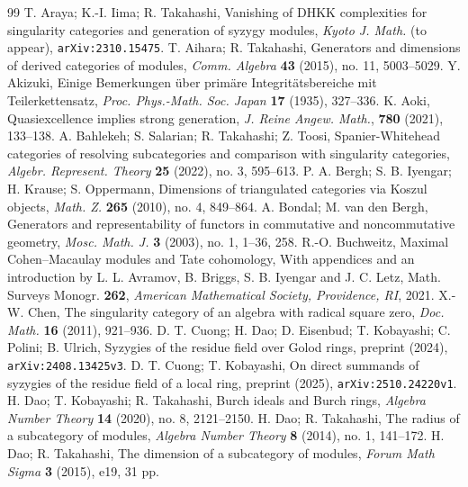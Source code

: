 \documentclass[10pt]{amsart}
\theoremstyle{definition}
\theoremstyle{remark}
\numberwithin{equation}{thm}
\begin{document}
\begin{thebibliography}{99}
{\sc T. Araya; K.-I. Iima; R. Takahashi}, 
Vanishing of DHKK complexities for singularity categories and generation of syzygy modules, {\em Kyoto J. Math.} (to appear), {\tt arXiv:2310.15475}.
{\sc T. Aihara; R. Takahashi}, Generators and dimensions of derived categories of modules, {\em Comm. Algebra} {\bf 43} (2015), no. 11, 5003--5029.
{\sc Y. Akizuki}, Einige Bemerkungen \"uber prim\"are Integrit\"atsbereiche mit Teilerkettensatz, {\em Proc. Phys.-Math. Soc. Japan} {\bf 17} (1935), 327--336.
{\sc K. Aoki}, Quasiexcellence implies strong generation, {\em J. Reine Angew. Math.}, {\bf 780} (2021), 133--138.
{\sc A. Bahlekeh; S. Salarian; R. Takahashi; Z. Toosi}, Spanier-Whitehead categories of resolving subcategories and comparison with singularity categories, {\em Algebr. Represent. Theory} {\bf 25} (2022), no. 3, 595--613.
{\sc P. A. Bergh; S. B. Iyengar; H. Krause; S. Oppermann}, Dimensions of triangulated categories via Koszul objects, {\em Math. Z.} {\bf 265} (2010), no. 4, 849--864.
{\sc A. Bondal; M. van den Bergh}, Generators and representability of functors in commutative and noncommutative geometry, {\em Mosc. Math. J.} {\bf 3} (2003), no. 1, 1--36, 258.
{\sc R.-O. Buchweitz}, Maximal Cohen--Macaulay modules and Tate cohomology, With appendices and an introduction by L. L. Avramov, B. Briggs, S. B. Iyengar and J. C. Letz, Math. Surveys Monogr. {\bf 262}, {\em American Mathematical Society, Providence, RI}, 2021.
{\sc X.-W. Chen}, The singularity category of an algebra with radical square zero, {\em Doc. Math.} {\bf 16} (2011), 921--936.
{\sc D. T. Cuong; H. Dao; D. Eisenbud; T. Kobayashi; C. Polini; B. Ulrich}, Syzygies of the residue field over Golod rings, preprint (2024), {\tt arXiv:2408.13425v3}.
{\sc D. T. Cuong; T. Kobayashi}, On direct summands of syzygies of the residue field of a local ring, preprint (2025), {\tt arXiv:2510.24220v1}.
{\sc H. Dao; T. Kobayashi; R. Takahashi}, Burch ideals and Burch rings, {\em Algebra Number Theory} {\bf 14} (2020), no. 8, 2121--2150.
{\sc H. Dao; R. Takahashi}, The radius of a subcategory of modules, {\em Algebra Number Theory} {\bf 8} (2014), no. 1, 141--172.
{\sc H. Dao; R. Takahashi}, The dimension of a subcategory of modules, {\em Forum Math Sigma} {\bf 3} (2015), e19, 31 pp.

\end{thebibliography}
\end{document}
